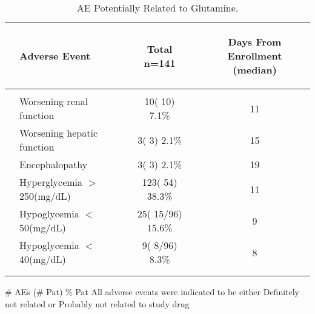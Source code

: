 \documentclass[dvips, 10pt]{article}
\begin{document}
\begin{table}[t]
\caption
{ AE Potentially Related to Glutamine. }
\begin{center}
\begin{tabular}{ @{}l@{}
@{}l@{}@{}p{1.5em}@{}@{}c@{}@{}p{1.5em}@{}@{}c@{}
}
\hline

& \parbox{6em}{\begin{center}Adverse Event\end{center}} && \parbox{6em}{\begin{center}Total n=141\end{center}} && \parbox{6em}{\begin{center}Days From Enrollment  (median)\end{center}} \\

\hline

\\
& Worsening renal function && 10( 10)  7.1\% && 11 \\
& Worsening hepatic function && 3(  3)  2.1\% && 15 \\
& Encephalopathy && 3(  3)  2.1\% && 19 \\
& Hyperglycemia $>$250(mg/dL) && 123( 54) 38.3\% && 11 \\
& Hypoglycemia $<$50(mg/dL) && 25( 15/96) 15.6\% && 9 \\
& Hypoglycemia $<$40(mg/dL) && 9(  8/96)  8.3\% && 8 \\
\\
\hline \\

\end{tabular}


\parbox{ 5in }{ \# AEs (\# Pat) \% Pat \newline All adverse events were indicated to be either Definitely not related or Probably not related 
 to study drug } \\
 \vspace{1em}\end{center}
 \end{table}
\clearpage
\end{document}
